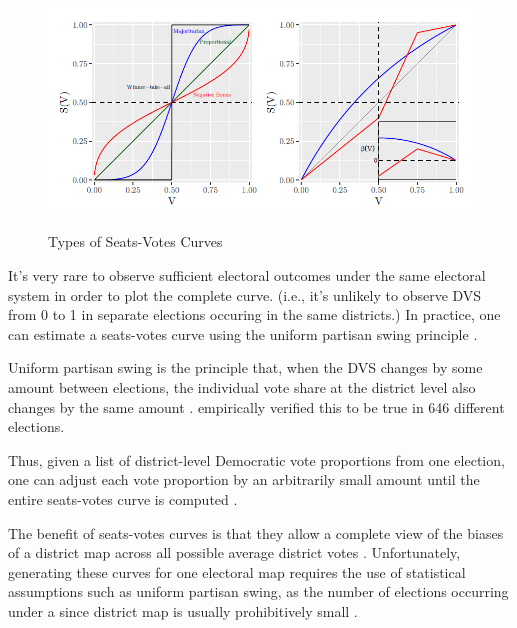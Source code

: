\begin{figure}[hb]
    \caption{Types of Seats-Votes Curves}
    \includegraphics[width=0.8\linewidth]{img/seatsvotes.png}
    \label{fig:seatsvotes}
    \raggedright
\end{figure}

It's very rare to observe sufficient electoral outcomes under the same electoral system in order to plot the complete curve. (i.e., it's unlikely to observe DVS from 0 to 1 in separate elections occuring in the same districts.) In practice, one can estimate a seats-votes curve using the uniform partisan swing principle \parencite{tufte1973}.

Uniform partisan swing is the principle that, when the DVS changes by some amount between elections, the individual vote share at the district level also changes by the same amount \parencite{tufte1973}. \textcite{katz2020} empirically verified this to be true in 646 different elections. 

Thus, given a list of district-level Democratic vote proportions from one election, one can adjust each vote proportion by an arbitrarily small amount until the entire seats-votes curve is computed \parencite{katz2020}.

The benefit of seats-votes curves is that they allow a complete view of the biases of a district map across all possible average district votes \parencite{gelman1994}. Unfortunately, generating these curves for one electoral map requires the use of statistical assumptions such as uniform partisan swing, as the number of elections occurring under a since district map is usually prohibitively small \parencite{warrington2018}.

